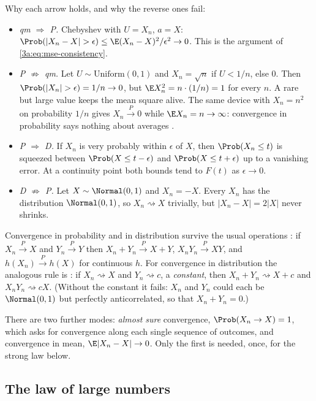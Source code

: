Why each arrow holds, and why the reverse ones fail:
\begin{itemize}
  \item \emph{qm $\Rightarrow$ P.} Chebyshev with $U=X_n$, $a=X$:
        $\Prob(|X_n-X|>\epsilon)\le\E(X_n-X)^2/\epsilon^2\to0$. This is the
        argument of \eqref{3a:eq:mse-consistency}.
  \item \emph{P $\not\Rightarrow$ qm.} Let $U\sim\mathrm{Uniform}(0,1)$ and
        $X_n=\sqrt n$ if $U<1/n$, else $0$. Then
        $\Prob(|X_n|>\epsilon)=1/n\to0$, but $\E X_n^2=n\cdot(1/n)=1$ for
        every $n$. A rare but large value keeps the mean square alive. The
        same device with $X_n=n^2$ on probability $1/n$ gives
        $X_n\xrightarrow{P}0$ while $\E X_n=n\to\infty$: convergence in
        probability says nothing about averages .
  \item \emph{P $\Rightarrow$ D.} If $X_n$ is very probably within $\epsilon$
        of $X$, then $\Prob(X_n\le t)$ is squeezed between
        $\Prob(X\le t-\epsilon)$ and $\Prob(X\le t+\epsilon)$ up to a vanishing
        error. At a continuity point both bounds tend to $F(t)$ as
        $\epsilon\to0$.
  \item \emph{D $\not\Rightarrow$ P.} Let $X\sim\Normal(0,1)$ and $X_n=-X$.
        Every $X_n$ has the distribution $\Normal(0,1)$, so $X_n\rightsquigarrow X$
        trivially, but $|X_n-X|=2|X|$ never shrinks.
\end{itemize}

Convergence in probability and in distribution survive the usual
operations : if $X_n\xrightarrow{P}X$ and
$Y_n\xrightarrow{P}Y$ then $X_n+Y_n\xrightarrow{P}X+Y$,
$X_nY_n\xrightarrow{P}XY$, and $h(X_n)\xrightarrow{P}h(X)$ for continuous $h$.
For convergence in distribution the analogous rule is : if $X_n\rightsquigarrow X$ and $Y_n\rightsquigarrow c$, a
\emph{constant}, then $X_n+Y_n\rightsquigarrow X+c$ and
$X_nY_n\rightsquigarrow cX$. (Without the constant it fails: $X_n$ and
$Y_n$ could each be $\Normal(0,1)$ but perfectly anticorrelated, so that
$X_n+Y_n=0$.)

There are two further modes: \emph{almost sure} convergence,
$\Prob(X_n\to X)=1$, which asks for convergence along each single sequence
of outcomes, and convergence in mean, $\E|X_n-X|\to0$. Only the first is
needed, once, for the strong law below.

\subsection{The law of large numbers}
\label{3a:sec:lln}

